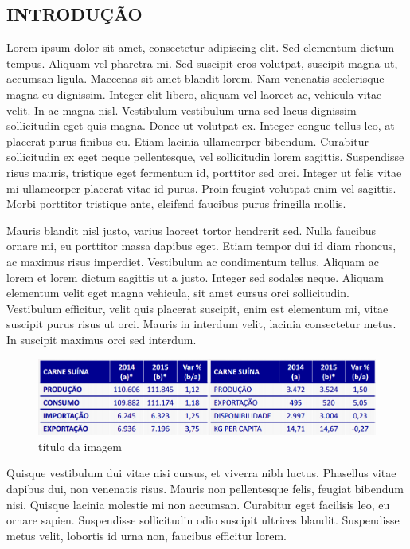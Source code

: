 \documentclass[article,12pt,oneside,a4paper,english,brazil]{unifil}
\begin{document}
\textual
\fontsize{12}{7}\selectfont
\begin{Spacing}{1.5}

\section*{INTRODUÇÃO}

Lorem ipsum dolor sit amet, consectetur adipiscing elit. Sed elementum dictum tempus. Aliquam vel pharetra mi. Sed suscipit eros volutpat, suscipit magna ut, accumsan ligula. Maecenas sit amet blandit lorem. Nam venenatis scelerisque magna eu dignissim. Integer elit libero, aliquam vel laoreet ac, vehicula vitae velit. In ac magna nisl. Vestibulum vestibulum urna sed lacus dignissim sollicitudin eget quis magna. Donec ut volutpat ex. Integer congue tellus leo, at placerat purus finibus eu. Etiam lacinia ullamcorper bibendum. Curabitur sollicitudin ex eget neque pellentesque, vel sollicitudin lorem sagittis. Suspendisse risus mauris, tristique eget fermentum id, porttitor sed orci. Integer ut felis vitae mi ullamcorper placerat vitae id purus. Proin feugiat volutpat enim vel sagittis. Morbi porttitor tristique ante, eleifend faucibus purus fringilla mollis.

Mauris blandit nisl justo, varius laoreet tortor hendrerit sed. Nulla faucibus ornare mi, eu porttitor massa dapibus eget. Etiam tempor dui id diam rhoncus, ac maximus risus imperdiet. Vestibulum ac condimentum tellus. Aliquam ac lorem et lorem dictum sagittis ut a justo. Integer sed sodales neque. Aliquam elementum velit eget magna vehicula, sit amet cursus orci sollicitudin. Vestibulum efficitur, velit quis placerat suscipit, enim est elementum mi, vitae suscipit purus risus ut orci. Mauris in interdum velit, lacinia consectetur metus. In suscipit maximus orci sed interdum.

\begin{figure}[!h]
\caption{título da imagem}
\centering
\includegraphics[width=\textwidth]{fig1.png}
\end{figure}

Quisque vestibulum dui vitae nisi cursus, et viverra nibh luctus. Phasellus vitae dapibus dui, non venenatis risus. Mauris non pellentesque felis, feugiat bibendum nisi. Quisque lacinia molestie mi non accumsan. Curabitur eget facilisis leo, eu ornare sapien. Suspendisse sollicitudin odio suscipit ultrices blandit. Suspendisse metus velit, lobortis id urna non, faucibus efficitur lorem.


\end{Spacing}
\end{document}
